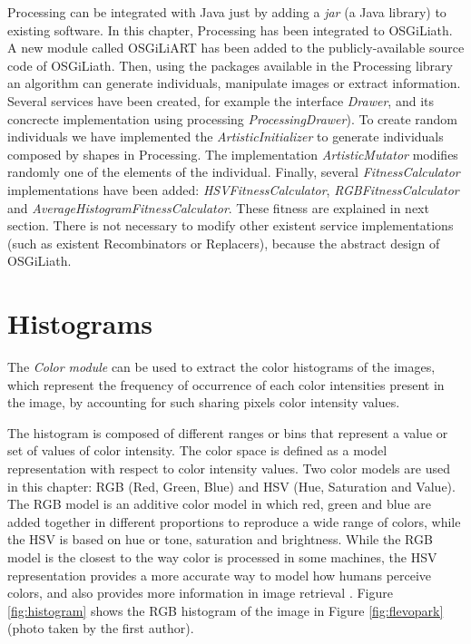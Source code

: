 Processing can be integrated with Java just by adding a {\em jar} (a
Java library) to existing software. In this chapter, Processing has
been integrated to OSGiLiath. A new module called OSGiLiART has been
added to the publicly-available source code of OSGiLiath.  %
Then, using the packages available in the Processing library an algorithm can generate individuals, manipulate images or extract information. Several services have been created, for example the interface {\em Drawer}, and its concrecte implementation using processing {\em ProcessingDrawer}). To create random individuals we have implemented the {\em ArtisticInitializer} to generate individuals composed by shapes in Processing. The implementation {\em ArtisticMutator} modifies randomly one of the elements of the individual. Finally, several {\em FitnessCalculator} implementations have been added: {\em HSVFitnessCalculator}, {\em RGBFitnessCalculator} and {\em AverageHistogramFitnessCalculator}. These fitness are explained in next section. There is not necessary to modify other existent service implementations (such as existent Recombinators or Replacers), because the abstract design of OSGiLiath.

\section{Histograms} %
The {\em Color module} can be used to extract the color histograms of
the images, which represent the frequency of occurrence of each color
intensities present in the image, by accounting for such sharing
pixels color intensity values. %

The histogram is composed of different ranges or bins that represent a value or set of values of color intensity. The color space is defined as a model representation with respect to color intensity values. Two color models are used in this chapter: RGB (Red, Green, Blue) and HSV (Hue, Saturation and Value). The RGB model is an additive color model in which red, green and blue are added together in different proportions to reproduce a wide range of colors, while the HSV is based on hue or tone, saturation and brightness. While the RGB model is the closest to the way color is processed in some machines, the HSV representation provides a more accurate way to model how humans perceive colors, and also provides more information in image retrieval \cite{COLORDIFFERENCES}.
Figure \ref{fig:histogram} shows the RGB histogram of the image in Figure \ref{fig:flevopark} (photo taken by the first author).

